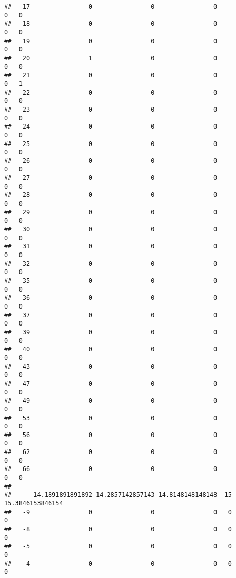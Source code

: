 \documentclass[]{article}
\begin{document}
\begin{verbatim}
##   17                0                0                0               0   0
##   18                0                0                0               0   0
##   19                0                0                0               0   0
##   20                1                0                0               0   0
##   21                0                0                0               0   1
##   22                0                0                0               0   0
##   23                0                0                0               0   0
##   24                0                0                0               0   0
##   25                0                0                0               0   0
##   26                0                0                0               0   0
##   27                0                0                0               0   0
##   28                0                0                0               0   0
##   29                0                0                0               0   0
##   30                0                0                0               0   0
##   31                0                0                0               0   0
##   32                0                0                0               0   0
##   35                0                0                0               0   0
##   36                0                0                0               0   0
##   37                0                0                0               0   0
##   39                0                0                0               0   0
##   40                0                0                0               0   0
##   43                0                0                0               0   0
##   47                0                0                0               0   0
##   49                0                0                0               0   0
##   53                0                0                0               0   0
##   56                0                0                0               0   0
##   62                0                0                0               0   0
##   66                0                0                0               0   0
##     
##      14.1891891891892 14.2857142857143 14.8148148148148  15 15.3846153846154
##   -9                0                0                0   0                0
##   -8                0                0                0   0                0
##   -5                0                0                0   0                0
##   -4                0                0                0   0                0

\end{verbatim}
\end{document}
